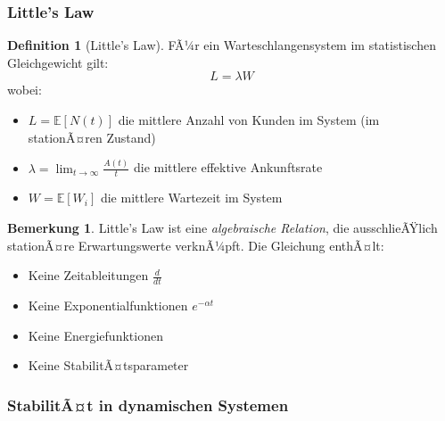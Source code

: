 ﻿\documentclass[a4paper,12pt]{scrreprt}
\theoremstyle{definition}
\newtheorem{definition}{Definition}[section]
\newtheorem{bemerkung}{Bemerkung}[section]
\begin{document}
\subsubsection{Little's Law}

\begin{definition}[Little's Law]
	FÃ¼r ein Warteschlangensystem im statistischen Gleichgewicht gilt:
	\begin{equation}
		L = \lambda W
	\end{equation}
	wobei:
	\begin{itemize}
		\item[-] $L = \mathbb{E}[N(t)]$ die mittlere Anzahl von Kunden im System (im stationÃ¤ren Zustand)
		\item[-] $\lambda = \lim_{t \to \infty} \frac{A(t)}{t}$ die mittlere effektive Ankunftsrate
		\item[-] $W = \mathbb{E}[W_i]$ die mittlere Wartezeit im System
	\end{itemize}
\end{definition}

\begin{bemerkung}
	Little's Law ist eine \textit{algebraische Relation}, die ausschlieÃŸlich stationÃ¤re Erwartungswerte verknÃ¼pft. Die Gleichung enthÃ¤lt:
	\begin{itemize}
		\item[-] Keine Zeitableitungen $\frac{d}{dt}$
		\item[-] Keine Exponentialfunktionen $e^{-\alpha t}$
		\item[-] Keine Energiefunktionen
		\item[-] Keine StabilitÃ¤tsparameter
	\end{itemize}
\end{bemerkung}

\subsubsection{StabilitÃ¤t in dynamischen Systemen}
\end{document}
